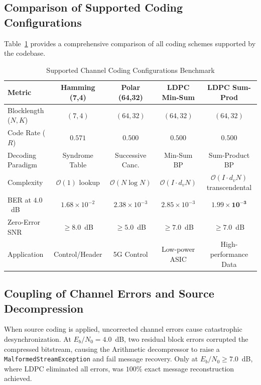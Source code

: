 \documentclass[conference]{IEEEtran}
\begin{document}
\subsection{Comparison of Supported Coding Configurations}
Table~\ref{tab:codecs_comp} provides a comprehensive comparison of all coding schemes supported by the codebase.

\begin{table}[htbp]
\caption{Supported Channel Coding Configurations Benchmark}
\label{tab:codecs_comp}
\centering
\scriptsize
\begin{tabular}{lcccc}
\toprule
\textbf{Metric} & \textbf{Hamming (7,4)} & \textbf{Polar (64,32)} & \textbf{LDPC Min-Sum} & \textbf{LDPC Sum-Prod} \\
\midrule
Blocklength ($N, K$) & $(7, 4)$ & $(64, 32)$ & $(64, 32)$ & $(64, 32)$ \\
Code Rate ($R$) & $0.571$ & $0.500$ & $0.500$ & $0.500$ \\
Decoding Paradigm & Syndrome Table & Successive Canc. & Min-Sum BP & Sum-Product BP \\
Complexity & $\mathcal{O}(1)$ lookup & $\mathcal{O}(N \log N)$ & $\mathcal{O}(I \cdot d_v N)$ & $\mathcal{O}(I \cdot d_v N)$ transcendental \\
BER at $4.0$~dB & $1.68 \times 10^{-2}$ & $2.38 \times 10^{-3}$ & $2.85 \times 10^{-3}$ & $\mathbf{1.99 \times 10^{-3}}$ \\
Zero-Error SNR & $\ge 8.0$~dB & $\ge 5.0$~dB & $\ge 7.0$~dB & $\ge 7.0$~dB \\
Application & Control/Header & 5G Control & Low-power ASIC & High-performance Data \\
\bottomrule
\end{tabular}
\end{table}

\subsection{Coupling of Channel Errors and Source Decompression}
When source coding is applied, uncorrected channel errors cause catastrophic desynchronization. At $E_b/N_0 = 4.0$~dB, two residual block errors corrupted the compressed bitstream, causing the Arithmetic decompressor to raise a \texttt{MalformedStreamException} and fail message recovery. Only at $E_b/N_0 \ge 7.0$~dB, where LDPC eliminated all errors, was $100\%$ exact message reconstruction achieved.
\end{document}

